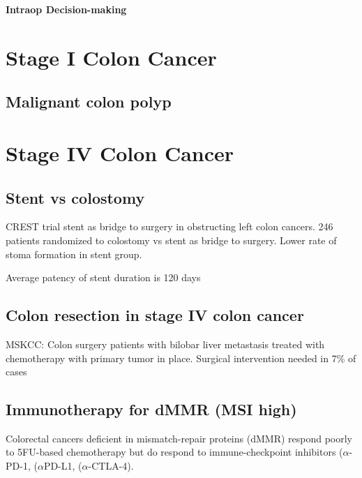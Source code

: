\documentclass[
]{book}
\begin{document}
\textbf{Intraop Decision-making}

\hypertarget{stage-i-colon-cancer}{%
\chapter{Stage I Colon Cancer}\label{stage-i-colon-cancer}}

\hypertarget{malignant-colon-polyp}{%
\section{Malignant colon polyp}\label{malignant-colon-polyp}}

\hypertarget{stage-iv-colon-cancer}{%
\chapter{Stage IV Colon Cancer}\label{stage-iv-colon-cancer}}

\hypertarget{stent-vs-colostomy}{%
\section{Stent vs colostomy}\label{stent-vs-colostomy}}

CREST trial\citep{crestcollaborativegroup1073} stent as bridge to surgery in obstructing left colon cancers. 246 patients randomized to colostomy vs stent as bridge to surgery. Lower rate of stoma formation in stent group.

Average patency of stent duration is 120 days

\hypertarget{colon-resection-in-stage-iv-colon-cancer}{%
\section{Colon resection in stage IV colon cancer}\label{colon-resection-in-stage-iv-colon-cancer}}

MSKCC: Colon surgery patients with bilobar liver metastasis treated with chemotherapy with primary tumor in place. Surgical intervention needed in 7\% of cases \citep{poultsides35}

\hypertarget{immunotherapy-for-dmmr-msi-high}{%
\section{Immunotherapy for dMMR (MSI high)}\label{immunotherapy-for-dmmr-msi-high}}

Colorectal cancers deficient in mismatch-repair proteins (dMMR) respond poorly to 5FU-based chemotherapy but do respond to immune-checkpoint inhibitors (\(\alpha\)-PD-1, (\(\alpha\)PD-L1, (\(\alpha\)-CTLA-4).
\end{document}
